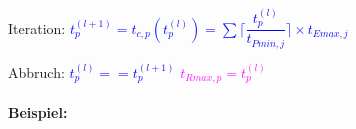 \documentclass[12pt,a4paper,oneside,ngerman]{article}
\begin{document}
Iteration: \textcolor{blue}{ \( t_{p}^{(l+1)} = t_{c,p}(t_{p}^{(l)}) = \displaystyle\sum \Big\lceil \dfrac{t_{p}^{(l)}}{ t_{Pmin,j} } \Big\rceil \times t_{Emax,j} \) }

Abbruch: \textcolor{blue}{ \( t_{p}^{(l)} == t_{p}^{(l+1)} \) }  \textcolor{magenta}{ \( t_{Rmax,p} = t_{p}^{(l)} \) }

\pagebreak

\paragraph{Beispiel:}
\end{document}
